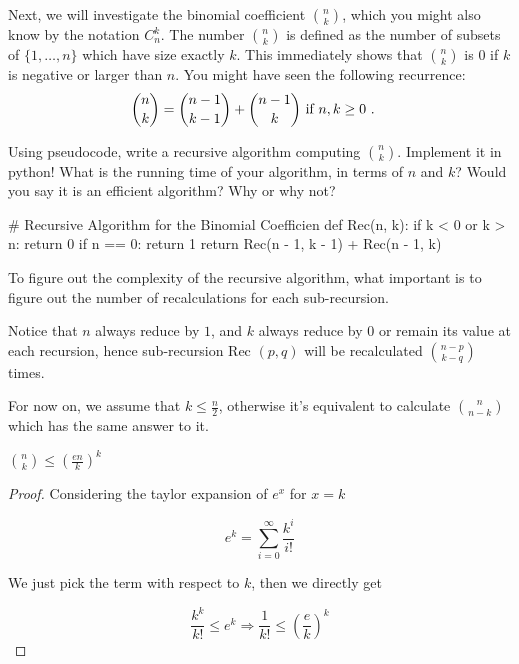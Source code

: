\documentclass[11pt,a4paper,oneside]{article}
\begin{document}
    Next, we will investigate the binomial coefficient ${n \choose k}$, which 
    you might also know by the notation $C^k_n$. The number ${n \choose k}$ is defined
    as the number of subsets of $\{1,\dots,n\}$ which have size exactly $k$. 
    This immediately shows that ${n \choose k}$ is $0$ if $k$ is negative or larger than $n$.
    You might have seen the following recurrence:
    \begin{align*}
     {n \choose k} & = {n-1 \choose k-1} + {n-1 \choose k} \textnormal{ if } n,k \geq 0 \ .
    \end{align*}



\begin{problem}{3} 
        Using pseudocode, write a recursive algorithm computing
        ${n \choose k}$. Implement it in python! What is 
        the running time of your algorithm, in terms of $n$ and $k$? Would you say it is an efficient
        algorithm? Why or why not?
    \solution
\begin{python}
# Recursive Algorithm for the Binomial Coefficien
def Rec(n, k):
    if k < 0 or k > n:
        return 0
    if n == 0:
	    return 1
    return Rec(n - 1, k - 1) + Rec(n - 1, k)
\end{python}
    
    To figure out the complexity of the recursive algorithm, what important is to figure out the number of recalculations for each sub-recursion.
    
    Notice that \( n \) always reduce by \( 1 \), and \( k \) always reduce by \(0\) or remain its value at each recursion, hence sub-recursion Rec \( (p, q) \) will be recalculated \( {n - p \choose k - q} \) times.
	
	For now on, we assume that $k \leq \frac n 2$, otherwise it's equivalent to calculate ${n \choose n - k}$ which has the same answer to it.

	\begin{lemma}
		\({n \choose k} \leq (\frac{en}{k})^k\)
	\begin{proof}
		Considering the taylor expansion of \(e^x\) for \(x = k\)
		
		\[
			e^k = \sum_{i=0}^{\infty} \frac{k^i}{i!}
		\]
		
		We just pick the term with respect to \(k\), then we directly get 
		
		\[
			\frac{k^k}{k!} \leq e^k \Rightarrow \frac{1}{k!} \leq (\frac{e}{k})^k
		\]
		

\end{proof}
\end{lemma}
\end{problem}
\end{document}
